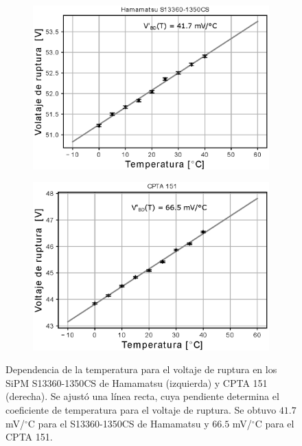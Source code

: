 \begin{figure}[h!]
     \centering
     \begin{subfigure}[b]{0.49\textwidth}
         \centering
         \includegraphics[width=1.1\textwidth]{Images/Vbd_vs_T_S13360.eps}
         \caption{}
         \label{fig:V_vd_13360}
     \end{subfigure}
     \begin{subfigure}[b]{0.49\textwidth}
         \centering
         \includegraphics[width=1.1\textwidth]{Images/Vbd_vs_T_CPTA151.eps}
         \caption{}
         \label{fig:V_vd_cpta}
     \end{subfigure}
        \caption{Dependencia de la temperatura para el voltaje de ruptura en los SiPM S13360-1350CS de Hamamatsu (izquierda) y CPTA 151 (derecha). Se ajustó una línea recta, cuya pendiente determina el coeficiente de temperatura para el voltaje de ruptura. Se obtuvo $41.7$ mV/$^\circ$C para el S13360-1350CS de Hamamatsu y $66.5$ mV/$^\circ$C para el CPTA 151.}
        \label{fig:Vbd_vs_T}
\end{figure}
